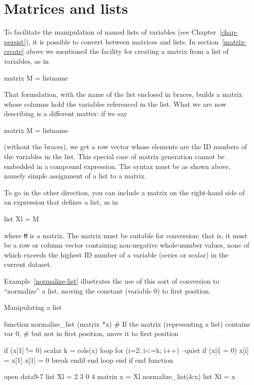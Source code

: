 \section{Matrices and lists}
\label{matrix-and-list}

To facilitate the manipulation of named lists of variables (see
Chapter~\ref{chap-persist}), it is possible to convert between
matrices and lists.  In section~\ref{matrix-create} above we mentioned
the facility for creating a matrix from a list of variables, as in
%
\begin{code}
matrix M = { listname }
\end{code}
%
That formulation, with the name of the list enclosed in braces, builds
a matrix whose columns hold the variables referenced in the list.
What we are now describing is a different matter: if we say
%
\begin{code}
matrix M = listname
\end{code}
%
(without the braces), we get a row vector whose elements are
the ID numbers of the variables in the list.  This special case
of matrix generation cannot be embedded in a compound
expression.  The syntax must be as shown above, namely simple
assignment of a list to a matrix.

To go in the other direction, you can include a matrix on the
right-hand side of an expression that defines a list, as in
%
\begin{code}
list Xl = M
\end{code}
%
where \texttt{M} is a matrix.  The matrix must be suitable for
conversion; that is, it must be a row or column vector containing
non-negative whole-number values, none of which exceeds the highest ID
number of a variable (series or scalar) in the current dataset.

Example~\ref{normalize-list} illustrates the use of this sort of
conversion to ``normalize'' a list, moving the constant (variable 0)
to first position.

\begin{script}[htbp]
  \caption{Manipulating a list}
  \label{normalize-list}
\begin{scode}
function normalize_list (matrix *x)
  # If the matrix (representing a list) contains var 0,
  # but not in first position, move it to first position

  if (x[1] != 0)
     scalar k = cols(x)
     loop for (i=2; i<=k; i++) --quiet
        if (x[i] = 0)
            x[i] = x[1]
            x[1] = 0
            break
         endif
     end loop
  end if
end function

open data9-7
list Xl = 2 3 0 4
matrix x = Xl
normalize_list(&x)
list Xl = x
\end{scode}
\end{script}


